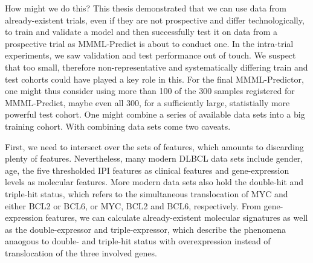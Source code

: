 How might we do this? This thesis demonstrated that we can use data from already-existent trials, 
even if they are not prospective and differ technologically, to train and validate a model and 
then successfully test it on data from a prospective trial as MMML-Predict is about to conduct one.
In the intra-trial experiments, we saw validation and test performance out of touch. We suspect 
that too small, therefore non-representative and systematically differing train and test cohorts 
could have played a key role in this. For the final MMML-Predictor, one might thus consider 
using more than \num{100} of the \num{300} samples registered for MMML-Predict, maybe even all 
\num{300}, for a sufficiently large, statistially more powerful test cohort. One might combine 
a series of available data sets into a big training cohort. With combining data sets come two 
caveats. 

First, we need to intersect over the sets of features, which amounts to discarding plenty 
of features. Nevertheless, many modern DLBCL data sets include gender, age, the five thresholded 
IPI features as clinical features and gene-expression levels as molecular features. More modern data 
sets also hold the double-hit and triple-hit status, which refers to the simultaneous translocation 
of MYC and either BCL2 or BCL6, or MYC, BCL2 and BCL6, respectively. From gene-expression 
features, we can calculate already-existent molecular signatures as well as the double-expressor and 
triple-expressor, which describe the phenomena anaogous to double- and triple-hit status with 
overexpression instead of translocation of the three involved genes.

